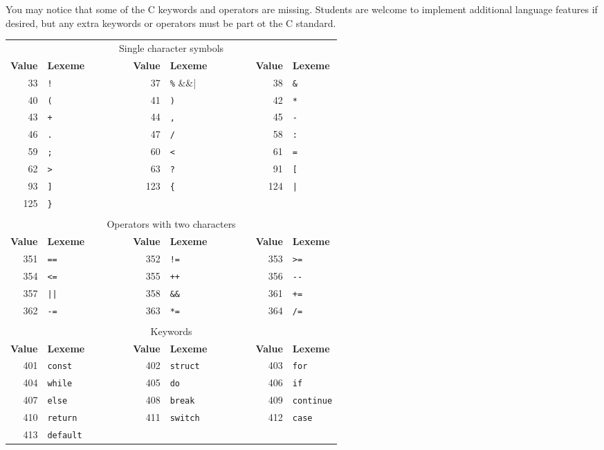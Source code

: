 \documentclass{article}
\begin{document}
You may notice that some of the C keywords and operators are missing.
Students are welcome to implement additional language features if desired,
but any extra keywords or operators must be part ot the C standard.

\begin{table}[t]
	\centering
	\begin{tabular}{rlcrlcrl}
		\multicolumn{8}{c}{Single character symbols}
		\\[1mm]
		{\bf Value} & {\bf Lexeme}
		& ~~~~~~ &
		{\bf Value} & {\bf Lexeme}
		& ~~~~~~ &
		{\bf Value} & {\bf Lexeme}
		\\ \cline{1-2} \cline{4-5} \cline{7-8}
		33 & \verb|!| &&
		37 & \verb|%| &&
		38 & \verb|&| \\
		40 & \verb|(| &&
		41 & \verb|)| &&
		42 & \verb|*| \\
		43 & \verb|+| &&
		44 & \verb|,| &&
		45 & \verb|-| \\
		46 & \verb|.| &&
		47 & \verb|/| &&
		58 & \verb|:| \\
		59 & \verb|;| &&
		60 & \verb|<| &&
		61 & \verb|=| \\
		62 & \verb|>| &&
		63 & \verb|?| &&
		91 & \verb|[| \\
		93 & \verb|]| &&
		123 & \verb|{| &&
		124 & \verb+|+ \\
		125 & \verb|}| \\
	\\
		\multicolumn{8}{c}{Operators with two characters}
		\\[1mm]
		{\bf Value} & {\bf Lexeme}
		& ~~~~~~ &
		{\bf Value} & {\bf Lexeme}
		& ~~~~~~ &
		{\bf Value} & {\bf Lexeme}
		\\ \cline{1-2} \cline{4-5} \cline{7-8}
		351 & \verb|==| &&
		352 & \verb|!=| &&
		353 & \verb|>=| \\
		354 & \verb|<=| &&
		355 & \verb|++| &&
		356 & \verb|--| \\
		357 & \verb+||+ &&
		358 & \verb|&&| &&
		361 & \verb|+=| \\
		362 & \verb|-=| &&
		363 & \verb|*=| &&
		364 & \verb|/=| \\
	\\
		\multicolumn{8}{c}{Keywords}
		\\[1mm]
		{\bf Value} & {\bf Lexeme}
		& ~~~~~~ &
		{\bf Value} & {\bf Lexeme}
		& ~~~~~~ &
		{\bf Value} & {\bf Lexeme}
		\\ \cline{1-2} \cline{4-5} \cline{7-8}
		401 & \verb|const| &&
		402 & \verb|struct| &&
		403 & \verb|for| \\
		404 & \verb|while| &&
		405 & \verb|do| &&
		406 & \verb|if| \\
		407 & \verb|else| &&
		408 & \verb|break| &&
		409 & \verb|continue| \\
		410 & \verb|return| &&
		411 & \verb|switch| &&
		412 & \verb|case| \\
		413 & \verb|default| \\
	\end{tabular}


\end{table}
\end{document}
